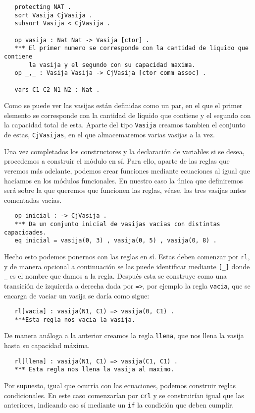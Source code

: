 {\codesize
\begin{verbatim}
   protecting NAT .
   sort Vasija CjVasija .
   subsort Vasija < CjVasija .

   op vasija : Nat Nat -> Vasija [ctor] .
   *** El primer numero se corresponde con la cantidad de liquido que contiene 
       la vasija y el segundo con su capacidad maxima.
   op _,_ : Vasija Vasija -> CjVasija [ctor comm assoc] .

   vars C1 C2 N1 N2 : Nat .
\end{verbatim}
}
Como se puede ver las vasijas están definidas como un par, en el que el primer elemento se corresponde con la cantidad de líquido que contiene y el segundo con la capacidad total de esta. Aparte del tipo \texttt{Vasija} creamos tambien el conjunto de estas, \texttt{CjVasijas}, en el que almacemaremos varias vasijas a la vez.\par 

Una vez completados los constructores y la declaración de variables si se desea, procedemos a construir el módulo en sí. Para ello, aparte de las reglas que veremos más adelante, podemos crear funciones mediante ecuaciones al igual que hacíamos en los módulos funcionales. En nuestro caso la única que definiremos será sobre la que queremos que funcionen las reglas, véase, las tres vasijas antes comentadas vacías.\par

{\codesize
\begin{verbatim}
   op inicial : -> CjVasija .
   *** Da un conjunto inicial de vasijas vacias con distintas capacidades.
   eq inicial = vasija(0, 3) , vasija(0, 5) , vasija(0, 8) .
\end{verbatim}
}

Hecho esto podemos ponernos con las reglas en sí. Estas deben comenzar por \verb"rl", y de manera opcional a continuación se las puede identificar mediante \verb"[_]" donde \verb"_" es el nombre que damos a la regla. Después esta se construye como una transición de izquierda a derecha dada por \verb"=>", por ejemplo la regla \texttt{vacia}, que se encarga de vaciar un vasija se daría como sigue:\par

{\codesize
\begin{verbatim}
   rl[vacia] : vasija(N1, C1) => vasija(0, C1) .
   ***Esta regla nos vacia la vasija.
\end{verbatim}
}
De manera análoga a la anterior creamos la regla \texttt{llena}, que nos llena la vasija hasta su capacidad máxima.\par
{\codesize
\begin{verbatim}
   rl[llena] : vasija(N1, C1) => vasija(C1, C1) .
   *** Esta regla nos llena la vasija al maximo.
\end{verbatim}
}
Por supuesto, igual que ocurría con las ecuaciones, podemos construir reglas condicionales. En este caso comenzarían por \verb"crl" y se construirían igual que las anteriores, indicando eso sí mediante un \texttt{if} la condición que deben cumplir.\par


